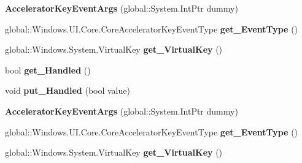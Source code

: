 \begin{DoxyCompactItemize}
{\bfseries Accelerator\+Key\+Event\+Args} (global\+::\+System.\+Int\+Ptr dummy)
\item 
\mbox{\label{class_windows_1_1_u_i_1_1_core_1_1_accelerator_key_event_args_a9a5dc0ed03bd53c9e3c96ce9b323ba62}} 
global\+::\+Windows.\+U\+I.\+Core.\+Core\+Accelerator\+Key\+Event\+Type {\bfseries get\+\_\+\+Event\+Type} ()
\item 
\mbox{\label{class_windows_1_1_u_i_1_1_core_1_1_accelerator_key_event_args_a39f6aef5666a666ca9e4e71b3579144c}} 
global\+::\+Windows.\+System.\+Virtual\+Key {\bfseries get\+\_\+\+Virtual\+Key} ()
\item 
\mbox{\label{class_windows_1_1_u_i_1_1_core_1_1_accelerator_key_event_args_a329fc83b7d7c9686615b8d9f1f91c297}} 
bool {\bfseries get\+\_\+\+Handled} ()
\item 
\mbox{\label{class_windows_1_1_u_i_1_1_core_1_1_accelerator_key_event_args_a3d9c66a182b0cf5b679a3869603c5907}} 
void {\bfseries put\+\_\+\+Handled} (bool value)
\item 
\mbox{\label{class_windows_1_1_u_i_1_1_core_1_1_accelerator_key_event_args_af50432bf9a9aaebc40975f48537de074}} 
{\bfseries Accelerator\+Key\+Event\+Args} (global\+::\+System.\+Int\+Ptr dummy)
\item 
\mbox{\label{class_windows_1_1_u_i_1_1_core_1_1_accelerator_key_event_args_a9a5dc0ed03bd53c9e3c96ce9b323ba62}} 
global\+::\+Windows.\+U\+I.\+Core.\+Core\+Accelerator\+Key\+Event\+Type {\bfseries get\+\_\+\+Event\+Type} ()
\item 
\mbox{\label{class_windows_1_1_u_i_1_1_core_1_1_accelerator_key_event_args_a39f6aef5666a666ca9e4e71b3579144c}} 
global\+::\+Windows.\+System.\+Virtual\+Key {\bfseries get\+\_\+\+Virtual\+Key} ()
\item 
\mbox{\label{class_windows_1_1_u_i_1_1_core_1_1_accelerator_key_event_args_a329fc83b7d7c9686615b8d9f1f91c297}} 

\end{DoxyCompactItemize}
